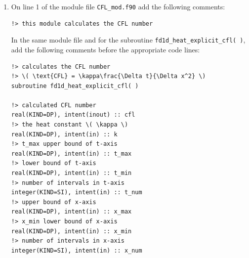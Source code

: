 \documentclass[12pt]{article}
\begin{document}
\begin{enumerate}
\begin{verbatim}
\end{verbatim}
\item On line 1 of the module file \texttt{CFL\_mod.f90} add the following comments:
\begin{verbatim}
!> this module calculates the CFL number
\end{verbatim}
In the same module file and for the subroutine \texttt{fd1d\_heat\_explicit\_cfl( )}, add
the following comments before the appropriate code lines:
\begin{verbatim}
!> calculates the CFL number  
!> \( \text{CFL} = \kappa\frac{\Delta t}{\Delta x^2} \)
subroutine fd1d_heat_explicit_cfl( )

!> calculated CFL number
real(KIND=DP), intent(inout) :: cfl
!> the heat constant \( \kappa \)
real(KIND=DP), intent(in) :: k
!> t_max upper bound of t-axis
real(KIND=DP), intent(in) :: t_max
!> lower bound of t-axis
real(KIND=DP), intent(in) :: t_min
!> number of intervals in t-axis
integer(KIND=SI), intent(in) :: t_num
!> upper bound of x-axis
real(KIND=DP), intent(in) :: x_max
!> x_min lower bound of x-axis
real(KIND=DP), intent(in) :: x_min
!> number of intervals in x-axis
integer(KIND=SI), intent(in) :: x_num
\end{verbatim}


\end{enumerate}
\end{document}
